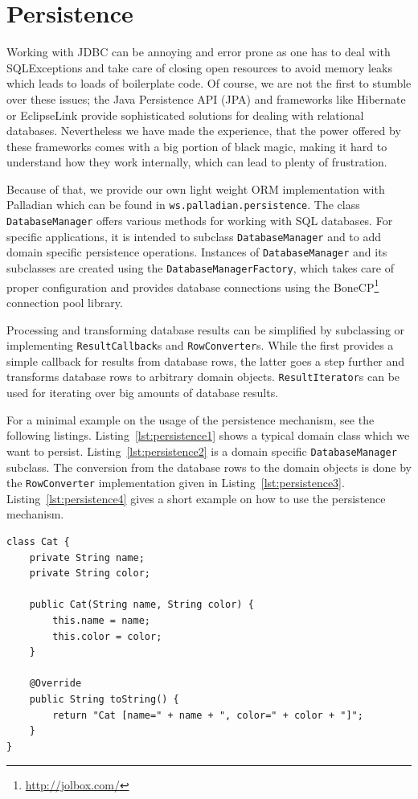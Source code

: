 \section{Persistence}

Working with JDBC can be annoying and error prone as one has to deal with SQLExceptions and take care of closing open resources to avoid memory leaks which leads to loads of boilerplate code. Of course, we are not the first to stumble over these issues; the Java Persistence API (JPA) and frameworks like Hibernate or 	EclipseLink provide sophisticated solutions for dealing with relational databases. Nevertheless we have made the experience, that the power offered by these frameworks comes with a big portion of black magic, making it hard to understand how they work internally, which can lead to plenty of frustration.

Because of that, we provide our own light weight ORM implementation with Palladian which can be found in \texttt{ws.palladian.persistence}. The class \texttt{DatabaseManager} offers various methods for working with SQL databases. For specific applications, it is intended to subclass \texttt{DatabaseManager} and to add domain specific persistence operations. Instances of \texttt{DatabaseManager} and its subclasses are created using the \texttt{DatabaseManagerFactory}, which takes care of proper configuration and provides database connections using the BoneCP\footnote{\url{http://jolbox.com/}} connection pool library.

Processing and transforming database results can be simplified by subclassing or implementing \texttt{ResultCallback}s and \texttt{RowConverter}s. While the first provides a simple callback for results from database rows, the latter goes a step further and transforms database rows to arbitrary domain objects. \texttt{ResultIterator}s can be used for iterating over big amounts of database results.

For a minimal example on the usage of the persistence mechanism, see the following listings. Listing~\ref{lst:persistence1} shows a typical domain class which we want to persist. Listing~\ref{lst:persistence2} is a domain specific \texttt{DatabaseManager} subclass. The conversion from the database rows to the domain objects is done by the \texttt{RowConverter} implementation given in Listing~\ref{lst:persistence3}. Listing~\ref{lst:persistence4} gives a short example on how to use the persistence mechanism.

\begin{codelisting}
\begin{lstlisting}[label=lst:persistence1,caption=Domain class]
class Cat {
    private String name;
    private String color;

    public Cat(String name, String color) {
        this.name = name;
        this.color = color;
    }

    @Override
    public String toString() {
        return "Cat [name=" + name + ", color=" + color + "]";
    }
}
\end{lstlisting}
\end{codelisting}

